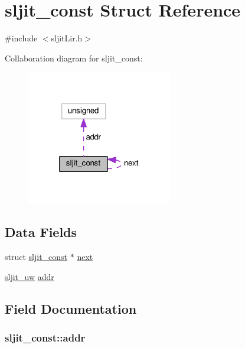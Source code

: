 \hypertarget{structsljit__const}{}\section{sljit\+\_\+const Struct Reference}
\label{structsljit__const}


{\ttfamily \#include $<$sljit\+Lir.\+h$>$}



Collaboration diagram for sljit\+\_\+const\+:
\nopagebreak
\begin{figure}[H]
\begin{center}
\leavevmode
\includegraphics[width=181pt]{structsljit__const__coll__graph}
\end{center}
\end{figure}
\subsection*{Data Fields}
\begin{DoxyCompactItemize}
\item 
struct \hyperlink{structsljit__const}{sljit\+\_\+const} $\ast$ \hyperlink{structsljit__const_a0fb6ce6e06520b5ac62b1ffd9bf994ec}{next}
\item 
\hyperlink{sljitConfigInternal_8h_a4f2aa7461612a199a0e3fd93cd9a4d02}{sljit\+\_\+uw} \hyperlink{structsljit__const_a8d9cb1c50bff3ba567630c67ae2ab9c2}{addr}
\end{DoxyCompactItemize}


\subsection{Field Documentation}
\subsubsection[{\texorpdfstring{addr}{addr}}]{ sljit\+\_\+const\+::addr}\hypertarget{structsljit__const_a8d9cb1c50bff3ba567630c67ae2ab9c2}{}\label{structsljit__const_a8d9cb1c50bff3ba567630c67ae2ab9c2}
